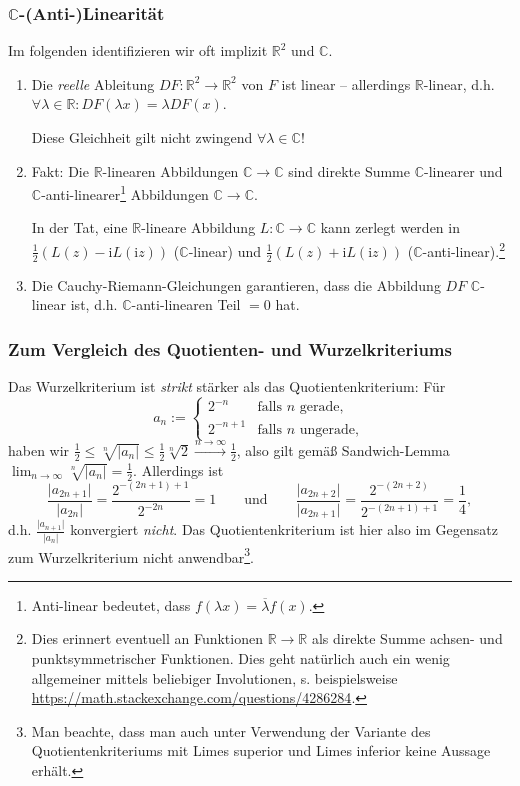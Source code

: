 \documentclass[10pt]{beamer}
\newcommand{\iu}{\mathrm{i}}
\begin{document}
\begin{frame}
	\frametitle{$\mathbb{C}$-(Anti-)Linearität}
	Im folgenden identifizieren wir oft implizit $\mathbb{R}^2$ und $\mathbb{C}$.
	\pause
	\begin{enumerate}
		\item[-] Die \emph{reelle} Ableitung $DF \colon \mathbb{R}^2 \to \mathbb{R}^2$ von $F$ ist linear -- allerdings $\mathbb{R}$-linear, d.h. $\forall \lambda \in \mathbb{R}: DF(\lambda x) = \lambda DF(x)$.
			\pause

			Diese Gleichheit gilt nicht zwingend $\forall \lambda \in \mathbb{C}$!
			\pause
		\item[-] Fakt: Die $\mathbb{R}$-linearen Abbildungen $\mathbb{C} \to \mathbb{C}$ sind direkte Summe $\mathbb{C}$-linearer und $\mathbb{C}$-anti-linearer\footnote<4->{Anti-linear bedeutet, dass $f(\lambda x) = \overline{\lambda} f(x)$.} Abbildungen $\mathbb{C} \to \mathbb{C}$.
			\pause

			In der Tat, eine $\mathbb{R}$-lineare Abbildung $L \colon \mathbb{C} \to \mathbb{C}$ kann zerlegt werden in $\frac{1}{2}(L(z) - \iu L(\iu z))$ ($\mathbb{C}$-linear) und $\frac{1}{2}(L(z) + \iu L(\iu z))$ ($\mathbb{C}$-anti-linear).\footnote<5->{Dies erinnert eventuell an Funktionen $\mathbb{R} \to \mathbb{R}$ als direkte Summe achsen- und punktsymmetrischer Funktionen. Dies geht natürlich auch ein wenig allgemeiner mittels beliebiger Involutionen, s. beispielsweise \url{https://math.stackexchange.com/questions/4286284}.}
			\pause
		\item[-] Die Cauchy-Riemann-Gleichungen garantieren, dass die Abbildung $D F$ $\mathbb{C}$-linear ist, d.h. $\mathbb{C}$-anti-linearen Teil $=0$ hat.
	\end{enumerate}
\end{frame}
\begin{frame}
	\pause
	\frametitle{Zum Vergleich des Quotienten- und Wurzelkriteriums}
	Das Wurzelkriterium ist \emph{strikt} stärker als das Quotientenkriterium: Für
	\[
		a_n := \begin{cases} 2^{-n} & \text{falls } n \text{ gerade}, \\ 2^{-n + 1} & \text{falls } n \text{ ungerade}, \end{cases}
	\]
	\pause
	haben wir $\frac{1}{2} \le \sqrt[n]{\lvert a_n \rvert} \le \frac{1}{2} \sqrt[n]{2} \overset{n \to \infty}{\longrightarrow} \frac{1}{2}$, also gilt gemäß \glqq Sandwich-Lemma\grqq{} $\lim_{n \to \infty} \sqrt[n]{\lvert a_n \rvert} = \frac{1}{2}$.
	\pause
	Allerdings ist
	\[
		\frac{\lvert a_{2n + 1} \rvert}{\lvert a_{2n} \rvert} = \frac{2^{-(2n + 1) + 1}}{2^{- 2 n}} = 1 \qquad \text{und} \qquad \frac{\lvert a_{2n + 2} \rvert}{\lvert a_{2n + 1} \rvert} = \frac{2^{-(2n + 2)}}{2^{-(2n + 1) + 1}} = \frac{1}{4},
	\]
	d.h. $\frac{\lvert a_{n + 1} \rvert}{\lvert a_n \rvert}$ konvergiert \emph{nicht}.
	Das Quotientenkriterium ist hier also im Gegensatz zum Wurzelkriterium nicht anwendbar\footnote<4->{Man beachte, dass man auch unter Verwendung der Variante des Quotientenkriteriums mit Limes superior und Limes inferior keine Aussage erhält.}.
\end{frame}
\end{document}
